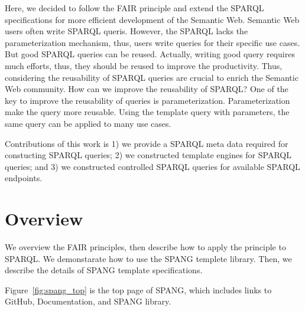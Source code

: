\documentclass[runningheads]{llncs}
\begin{document}
Here, we decided to follow the FAIR principle and extend the SPARQL specifications for more efficient development of the Semantic Web.
Semantic Web users often write SPARQL queris.
However, the SPARQL lacks the parameterization mechanism, thus, users write queries for their specific use cases.
But good SPARQL queries can be reused.
Actually, writing good query requires much efforts, thus, they should be reused to improve the productivity.
Thus, considering the reusability of SPARQL queries are crucial to enrich the Semantic Web community.
How can we improve the reusability of SPARQL?
One of the key to improve the reusability of queries is parameterization.
Parameterization make the query more reusable.
Using the template query with parameters, the same query can be applied to many use cases.

Contributions of this work is 
1) we provide a SPARQL meta data required for constucting SPARQL queries;
2) we constructed template engines for SPARQL queries; and
3) we constructed controlled SPARQL queries for available SPARQL endpoints.




\section{Overview}

We overview the FAIR principles, then describe how to apply the principle to SPARQL.
We demonstarate how to use the SPANG templete library.
Then, we describe the details of SPANG template specifications.


Figure~\ref{fig:spang_top} is the top page of SPANG, which includes links to GitHub, Documentation, and SPANG library.
\end{document}
